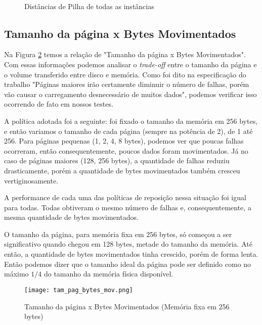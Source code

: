 \documentclass[12pt]{article}
\begin{document}
\begin{figure}
\centering
\mbox{\quad
{}}
\mbox{\quad
{}}
\caption{Distâncias de Pilha de todas as instâncias} \label{img_dist_pilha}
\end{figure}


\subsection{Tamanho da página x Bytes Movimentados}
\label{tam_pag_bytes_mov}

Na Figura \ref{tam_pag_bytes_mov} temos a relação de "Tamanho da página x Bytes Movimentados". Com essas informações podemos analisar o \textit{trade-off} entre o tamanho da página e o volume transferido entre disco e memória. Como foi dito na especificação do trabalho "Páginas maiores irão certamente diminuir o número de falhas, porém vão causar o carregamento desnecessário de muitos dados", podemos verificar isso ocorrendo de fato em nossos testes.

A política adotada foi a seguinte: foi fixado o tamanho da memória em 256 bytes, e então variamos o tamanho de cada página (sempre na potência de 2), de 1 até 256. Para páginas pequenas (1, 2, 4, 8 bytes), podemos ver que poucas falhas ocorreram, então consequentemente, poucos dados foram movimentados. Já no caso de páginas maiores (128, 256 bytes), a quantidade de falhas reduziu drasticamente, porém a quantidade de bytes movimentados também cresceu vertiginosamente.

A performance de cada uma das políticas de reposição nessa situação foi igual para todas. Todas obtiveram o mesmo número de falhas e, consequentemente, a mesma quantidade de bytes movimentados.

O tamanho da página, para memória fixa em 256 bytes, só começou a ser significativo quando chegou em 128 bytes, metade do tamanho da memória. Até então, a quantidade de bytes movimentados tinha crescido, porém de forma lenta. Então podemos dizer que o tamanho ideal da página pode ser definido como no máximo $1/4$ do tamanho da memória física disponível.

   \begin{figure}
        \centering
        \texttt{[image: tam\_pag\_bytes\_mov.png]}
        \caption{Tamanho da página x Bytes Movimentados (Memória fixa em 256 bytes)}
        \label{tam_pag_bytes_mov}
    \end{figure}
\end{document}
